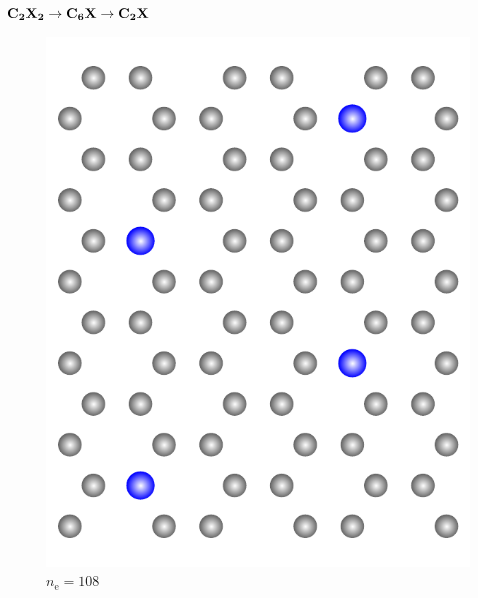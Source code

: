 \documentclass{beamer}
\def \nE {n_\mathrm{e}}
\begin{document}
\begin{frame}{$\bf C_{\boldsymbol 2}X_{\boldsymbol 2} \rightarrow C_{\boldsymbol 6}X \rightarrow C_{\boldsymbol 2}X$}
\begin{figure}
\begin{minipage}[b]{0.19\textwidth}
				\includegraphics[height=1.1\textwidth]{Abbildungen/ne108.pdf} \\
				$\nE = 108$
			\end{minipage}
		\end{figure}
	\end{frame}
	
\end{document}

